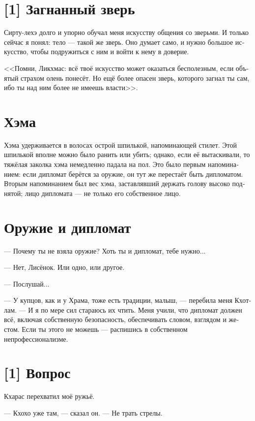 \documentclass[a4paper,12pt,fleqn]{book}\usepackage{cooltooltips}\usepackage{polyglossia}\setdefaultlanguage[babelshorthands=true]{russian}\setotherlanguage{english}\defaultfontfeatures{Ligatures=TeX,Mapping=tex-text} \usepackage{xcolor}\definecolor{lightgray}{HTML}{bbbbbb}\color{lightgray}\newcommand{\ml}[3]{\textenglish{\textcolor{black}{#3}}}
\begin{document}
{\section{[1] Загнанный зверь}

Сирту-лехэ долго и упорно обучал меня искусству общения со зверьми.
И только сейчас я понял: тело --- такой же зверь.
Оно думает само, и нужно большое искусство, чтобы подружиться с ним и войти к нему в доверие.

<<Помни, Ликхмас: всё твоё искусство может оказаться бесполезным, если объятый страхом олень понесёт.
Но ещё более опасен зверь, которого загнал ты сам, ибо ты над ним более не имеешь власти>>.

\section{Хэма}

Хэма удерживается в волосах острой шпилькой, напоминающей стилет.
Этой шпилькой вполне можно было ранить или убить;
однако, если её вытаскивали, то тяжёлая заколка хэма немедленно падала на пол.
Это было первым напоминанием: если дипломат берётся за оружие, он тут же перестаёт быть дипломатом.
Вторым напоминанием был вес хэма, заставлявший держать голову высоко поднятой;
лицо дипломата --- не только его собственное лицо.

\section{Оружие и дипломат}

--- Почему ты не взяла оружие?
Хоть ты и дипломат, тебе нужно...

--- Нет, Лисёнок.
Или одно, или другое.

--- Послушай...

--- У купцов, как и у Храма, тоже есть традиции, малыш, --- перебила меня Кхотлам.
--- И я по мере сил стараюсь их чтить.
Меня учили, что дипломат должен всё, включая собственную безопасность, обеспечивать словом, взглядом и жестом.
Если ты этого не можешь --- распишись в собственном непрофессионализме.

\section{[1] Вопрос}

Кхарас перехватил моё ружьё.

--- Кхохо уже там, --- сказал он.
--- Не трать стрелы.

}
\end{document}
